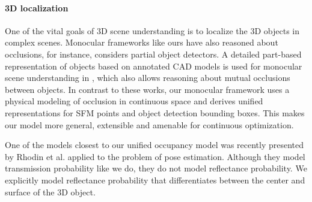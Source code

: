 

\vspace{-0.3cm}
\paragraph{3D localization}
One of the vital goals of 3D scene understanding is to localize the 3D objects in complex scenes. 
Monocular frameworks like ours have also reasoned about occlusions, for instance, \cite{Wojek_etal_2013} considers partial object detectors. A detailed part-based representation of objects based on annotated CAD models is used for monocular scene understanding in \cite{Zia_etal_2013,Zia_etal_2014}, which also allows reasoning about mutual occlusions between objects. In contrast to these works, our monocular framework uses a physical modeling of occlusion in continuous space and derives unified representations for SFM points and object detection bounding boxes. This makes our model more general, extensible and amenable for continuous optimization.

One of the models closest to our unified occupancy model was recently presented by Rhodin et al. \cite{Rhodin:2015} applied to the problem of pose estimation.  Although they model transmission probability like we do, they do not model reflectance probability. We explicitly model reflectance probability that differentiates between the center and surface of the 3D object.

